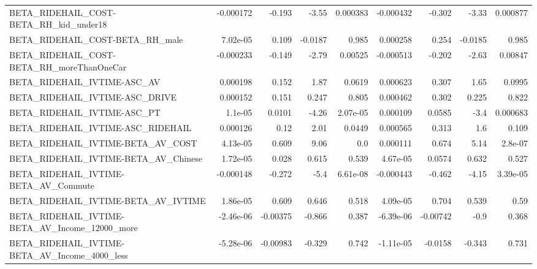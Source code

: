 \begin{tabular}{lrrrrrrrr}
BETA\_RIDEHAIL\_COST-BETA\_RH\_kid\_under18             &   -0.000172 &       -0.193 &    -3.55 & 0.000383 &  -0.000432 &      -0.302 &        -3.33 &      0.000877 \\
BETA\_RIDEHAIL\_COST-BETA\_RH\_male                    &    7.02e-05 &        0.109 &  -0.0187 &    0.985 &   0.000258 &       0.254 &      -0.0185 &         0.985 \\
BETA\_RIDEHAIL\_COST-BETA\_RH\_moreThanOneCar          &   -0.000233 &       -0.149 &    -2.79 &  0.00525 &  -0.000513 &      -0.202 &        -2.63 &       0.00847 \\
BETA\_RIDEHAIL\_IVTIME-ASC\_AV                        &    0.000198 &        0.152 &     1.87 &   0.0619 &   0.000623 &       0.307 &         1.65 &        0.0995 \\
BETA\_RIDEHAIL\_IVTIME-ASC\_DRIVE                     &    0.000152 &        0.151 &    0.247 &    0.805 &   0.000462 &       0.302 &        0.225 &         0.822 \\
BETA\_RIDEHAIL\_IVTIME-ASC\_PT                        &     1.1e-05 &       0.0101 &    -4.26 & 2.07e-05 &   0.000109 &      0.0585 &         -3.4 &      0.000683 \\
BETA\_RIDEHAIL\_IVTIME-ASC\_RIDEHAIL                  &    0.000126 &         0.12 &     2.01 &   0.0449 &   0.000565 &       0.313 &          1.6 &         0.109 \\
BETA\_RIDEHAIL\_IVTIME-BETA\_AV\_COST                  &    4.13e-05 &        0.609 &     9.06 &      0.0 &   0.000111 &       0.674 &         5.14 &       2.8e-07 \\
BETA\_RIDEHAIL\_IVTIME-BETA\_AV\_Chinese               &    1.72e-05 &        0.028 &    0.615 &    0.539 &   4.67e-05 &      0.0574 &        0.632 &         0.527 \\
BETA\_RIDEHAIL\_IVTIME-BETA\_AV\_Commute               &   -0.000148 &       -0.272 &     -5.4 & 6.61e-08 &  -0.000443 &      -0.462 &        -4.15 &      3.39e-05 \\
BETA\_RIDEHAIL\_IVTIME-BETA\_AV\_IVTIME                &    1.86e-05 &        0.609 &    0.646 &    0.518 &   4.09e-05 &       0.704 &        0.539 &          0.59 \\
BETA\_RIDEHAIL\_IVTIME-BETA\_AV\_Income\_12000\_more     &   -2.46e-06 &     -0.00375 &   -0.866 &    0.387 &  -6.39e-06 &    -0.00742 &         -0.9 &         0.368 \\
BETA\_RIDEHAIL\_IVTIME-BETA\_AV\_Income\_4000\_less      &   -5.28e-06 &     -0.00983 &   -0.329 &    0.742 &  -1.11e-05 &     -0.0158 &       -0.343 &         0.731 \\

\end{tabular}
